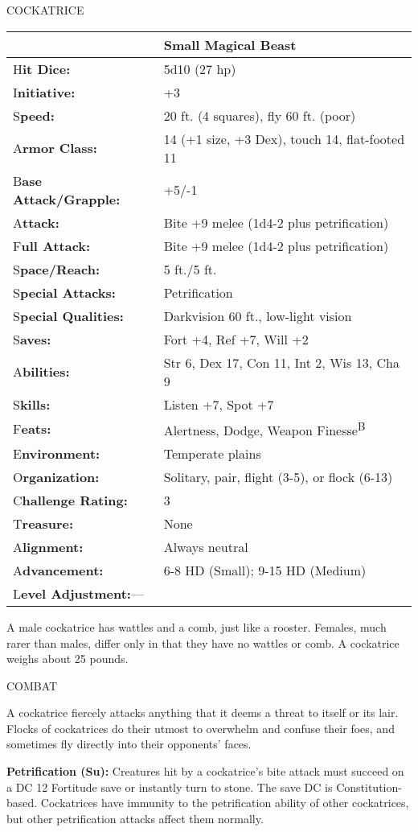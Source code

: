 \documentclass{article}
\begin{document}
\vspace{12pt}
{\LARGE{}COCKATRICE}

\begin{tabular}{|>{\raggedright}p{91pt}|>{\raggedright}p{180pt}|}
\hline
  & Small Magical Beast\tabularnewline
\hline
H\textbf{it Dice:} & 5d10 (27 hp)\tabularnewline
\hline
I\textbf{nitiative:} & +3\tabularnewline
\hline
S\textbf{peed:} & 20 ft. (4 squares), fly 60 ft. (poor)\tabularnewline
\hline
A\textbf{rmor Class:} & 14 (+1 size, +3 Dex), touch 14, flat-footed 11\tabularnewline
\hline
B\textbf{ase Attack/Grapple:} & +5/-1\tabularnewline
\hline
A\textbf{ttack:} & Bite +9 melee (1d4-2 plus petrification)\tabularnewline
\hline
F\textbf{ull Attack:} & Bite +9 melee (1d4-2 plus petrification)\tabularnewline
\hline
S\textbf{pace/Reach:} & 5 ft./5 ft.\tabularnewline
\hline
S\textbf{pecial Attacks:} & Petrification\tabularnewline
\hline
S\textbf{pecial Qualities:} & Darkvision 60 ft., low-light vision\tabularnewline
\hline
S\textbf{aves:} & Fort +4, Ref +7, Will +2\tabularnewline
\hline
A\textbf{bilities:} & Str 6, Dex 17, Con 11, Int 2, Wis 13, Cha 9\tabularnewline
\hline
S\textbf{kills:} & Listen +7, Spot +7\tabularnewline
\hline
F\textbf{eats:} & Alertness, Dodge, Weapon Finesse\textsuperscript{B}\tabularnewline
\hline
E\textbf{nvironment:} & Temperate plains\tabularnewline
\hline
O\textbf{rganization:} & Solitary, pair, flight (3-5), or flock (6-13)\tabularnewline
\hline
C\textbf{hallenge Rating:} & 3\tabularnewline
\hline
T\textbf{reasure:} & None\tabularnewline
\hline
A\textbf{lignment:} & Always neutral\tabularnewline
\hline
A\textbf{dvancement:} & 6-8 HD (Small); 9-15 HD (Medium)\tabularnewline
\hline
L\textbf{evel Adjustment:}--- & \tabularnewline
\hline
\end{tabular}

A male cockatrice has wattles and a comb, just like a rooster. Females, much rarer 
than males, differ only in that they have no wattles or comb. A cockatrice weighs 
about 25 pounds.

COMBAT

A cockatrice fiercely attacks anything that it deems a threat to itself or its 
lair. Flocks of cockatrices do their utmost to overwhelm and confuse their foes, 
and sometimes fly directly into their opponents' faces.

\textbf{Petrification (Su): }Creatures hit by a cockatrice's bite attack must succeed 
on a DC 12 Fortitude save or instantly turn to stone. The save DC is Constitution-based. 
 Cockatrices have immunity to the petrification ability of other cockatrices, but 
other petrification attacks affect them normally.
\end{document}
